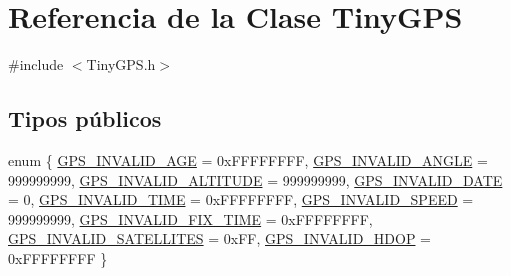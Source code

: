 \hypertarget{class_tiny_g_p_s}{}\section{Referencia de la Clase Tiny\+G\+PS}
\label{class_tiny_g_p_s}


{\ttfamily \#include $<$Tiny\+G\+P\+S.\+h$>$}

\subsection*{Tipos públicos}
\begin{DoxyCompactItemize}
\item 
enum \{ \newline
\hyperlink{class_tiny_g_p_s_adefa8554723aa8802edacd6094366f6fa79f64b88d2e9b3782612fed695d4c1a7}{G\+P\+S\+\_\+\+I\+N\+V\+A\+L\+I\+D\+\_\+\+A\+GE} = 0x\+F\+F\+F\+F\+F\+F\+FF, 
\hyperlink{class_tiny_g_p_s_adefa8554723aa8802edacd6094366f6fa4acc5c7138410c0d060b943190bd61fa}{G\+P\+S\+\_\+\+I\+N\+V\+A\+L\+I\+D\+\_\+\+A\+N\+G\+LE} = 999999999, 
\hyperlink{class_tiny_g_p_s_adefa8554723aa8802edacd6094366f6fa11af99b96673aa7b2919f4ce934deb15}{G\+P\+S\+\_\+\+I\+N\+V\+A\+L\+I\+D\+\_\+\+A\+L\+T\+I\+T\+U\+DE} = 999999999, 
\hyperlink{class_tiny_g_p_s_adefa8554723aa8802edacd6094366f6fa69def061d27ec3ad1d6982acd730f3c8}{G\+P\+S\+\_\+\+I\+N\+V\+A\+L\+I\+D\+\_\+\+D\+A\+TE} = 0, 
\newline
\hyperlink{class_tiny_g_p_s_adefa8554723aa8802edacd6094366f6fa1b7d220428b8d7bf86f71b82e729b432}{G\+P\+S\+\_\+\+I\+N\+V\+A\+L\+I\+D\+\_\+\+T\+I\+ME} = 0x\+F\+F\+F\+F\+F\+F\+FF, 
\hyperlink{class_tiny_g_p_s_adefa8554723aa8802edacd6094366f6fac40011126774b10aaf5f65558f907d33}{G\+P\+S\+\_\+\+I\+N\+V\+A\+L\+I\+D\+\_\+\+S\+P\+E\+ED} = 999999999, 
\hyperlink{class_tiny_g_p_s_adefa8554723aa8802edacd6094366f6fa13092501160cf2a1c52b517f62cc696e}{G\+P\+S\+\_\+\+I\+N\+V\+A\+L\+I\+D\+\_\+\+F\+I\+X\+\_\+\+T\+I\+ME} = 0x\+F\+F\+F\+F\+F\+F\+FF, 
\hyperlink{class_tiny_g_p_s_adefa8554723aa8802edacd6094366f6fafe0e59ff6f89b52341190684a91cf695}{G\+P\+S\+\_\+\+I\+N\+V\+A\+L\+I\+D\+\_\+\+S\+A\+T\+E\+L\+L\+I\+T\+ES} = 0x\+FF, 
\newline
\hyperlink{class_tiny_g_p_s_adefa8554723aa8802edacd6094366f6fa095bfdc8e38a31c6e1796bd58323b346}{G\+P\+S\+\_\+\+I\+N\+V\+A\+L\+I\+D\+\_\+\+H\+D\+OP} = 0x\+F\+F\+F\+F\+F\+F\+FF
 \}
\end{DoxyCompactItemize}
